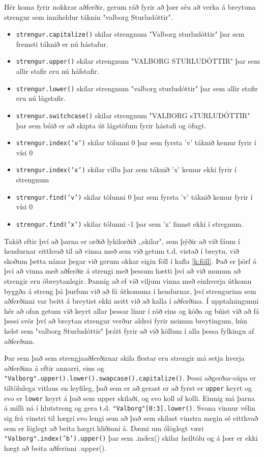 Hér koma fyrir nokkrar aðferðir, gerum ráð fyrir að þær séu að verka á breytuna strengur sem inniheldur táknin "valborg Sturludóttir".
\vspace{5px}
\begin{itemize}
	\item \texttt{strengur.capitalize()} skilar strengnum "Valborg sturludóttir" þar sem fremsti táknið er nú hástafur.
	\item \texttt{strengur.upper()} skilar strengnum "VALBORG STURLUDÓTTIR" þar sem allir stafir eru nú háfstafir.
	\item \texttt{strengur.lower()} skilar strengnum "valborg sturludóttir" þar sem allir stafir eru nú lágstafir.
	\item \texttt{strengur.switchcase()} skilar strengnum "VALBORG sTURLUDÓTTIR" þar sem búið er að skipta út lágstöfum fyrir hástafi og öfugt.
	\item \texttt{strengur.index('v')} skilar tölunni 0 þar sem fyrsta 'v' táknið kemur fyrir í vísi 0
	\item \texttt{strengur.index('x')} skilar villu þar sem táknið 'x' kemur ekki fyrir í strengnum
	\item \texttt{strengur.find('v')} skilar tölunni 0 þar sem fyrsta 'v' táknið kemur fyrir í vísi 0
	\item \texttt{strengur.find('x')} skilar tölunni -1 þar sem 'x' finnst ekki í stregnum. 
\end{itemize}
\vspace{10px}

Takið eftir því að þarna er orðið lykilorðið ,,skilar", sem þýðir að við fáum í hendurnar eitthvað til að vinna með sem við getum t.d. vistað í breytu, við skoðum þetta nánar þegar við gerum okkar eigin föll í kafla \ref{k:föll}.
Það er þörf á því að vinna með aðferðir á strengi með þessum hætti því að við munum að strengir eru óbreytanlegir.
Þannig að ef við viljum vinna með einhverja útkomu byggða á streng þá þurfum við að fá útkomuna í hendurnar, því strengurinn sem aðferðinni var beitt á breytist ekki neitt við að kalla í aðferðina.
Í upptalningunni hér að ofan getum við keyrt allar þessar línur í röð eins og kóða og búist við að fá þessi svör því að breytan strengur verður aldrei fyrir neinum breytingum, hún helst sem "valborg Sturludóttir" þrátt fyrir að við köllum í alla þessa fylkingu af aðferðum.

Þar sem það sem strengjaaðferðirnar skila flestar eru strengir má setja hverja aðferðina á eftir annarri, eins og \texttt{"Valborg".upper().lower().swapcase().capitalize()}.
Þessi aðgerðar-súpa er tiltölulega vitlaus en leyfileg, það sem er að gerast er að fyrst er \texttt{upper} keyrt og svo er \texttt{lower} keyrt á það sem upper skilaði, og svo koll af kolli.
Einnig má þarna á milli ná í hlutstreng og gera t.d. \texttt{"Valborg"[0:3].lower()}.
Svona vinnur vélin sig frá vinstri til hægri svo lengi sem að það sem skilast vinstra megin sé eitthvað sem er löglegt að beita hægri hliðinni á.
Dæmi um ólöglegt væri \texttt{"Valborg".index('b').upper()} þar sem .index() skilar heiltölu og á þær er ekki hægt að beita aðferinni .upper().


